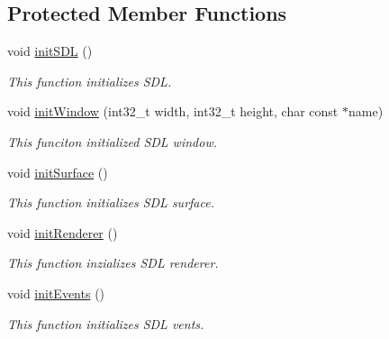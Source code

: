 \subsection*{Protected Member Functions}
\begin{DoxyCompactItemize}
\item 
\mbox{\label{classWindow_a99e0671f31b1e0fae2309dfbe8d54daf}} 
void \hyperlink{classWindow_a99e0671f31b1e0fae2309dfbe8d54daf}{init\+S\+DL} ()
\begin{DoxyCompactList}\small\item\em This function initializes S\+DL. \end{DoxyCompactList}\item 
void \hyperlink{classWindow_a520e7a72c81aa1bf3b8d7e4b59906569}{init\+Window} (int32\+\_\+t width, int32\+\_\+t height, char const $\ast$name)
\begin{DoxyCompactList}\small\item\em This funciton initialized S\+DL window. \end{DoxyCompactList}\item 
\mbox{\label{classWindow_a505288fdd1cf4ae5e6f781260e257fce}} 
void \hyperlink{classWindow_a505288fdd1cf4ae5e6f781260e257fce}{init\+Surface} ()
\begin{DoxyCompactList}\small\item\em This function initializes S\+DL surface. \end{DoxyCompactList}\item 
\mbox{\label{classWindow_acc6425810e18a85137aa70a8c5d11f97}} 
void \hyperlink{classWindow_acc6425810e18a85137aa70a8c5d11f97}{init\+Renderer} ()
\begin{DoxyCompactList}\small\item\em This function inzializes S\+DL renderer. \end{DoxyCompactList}\item 
\mbox{\label{classWindow_af21aa4f51374ee5234701e4b122950d8}} 
void \hyperlink{classWindow_af21aa4f51374ee5234701e4b122950d8}{init\+Events} ()
\begin{DoxyCompactList}\small\item\em This function initializes S\+DL vents. \end{DoxyCompactList}\item 
\mbox{\label{classWindow_a381364c2704bed978cdf9df669c4b629}} 

\end{DoxyCompactItemize}
